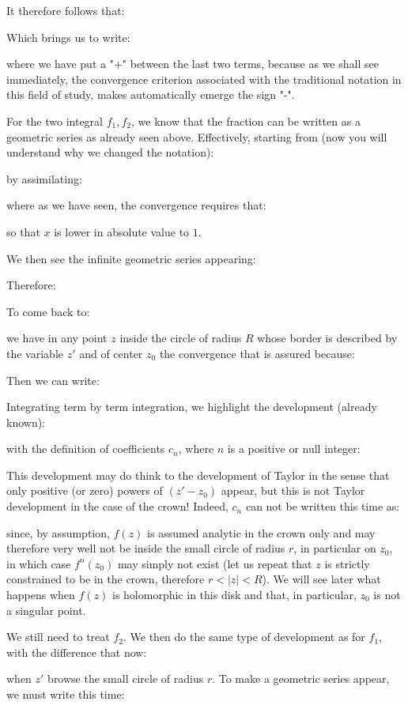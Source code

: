 	It therefore follows that:
	
	Which brings us to write:
	
	where we have put a "+" between the last two terms, because as we shall see immediately, the convergence criterion associated with the traditional notation in this field of study, makes automatically emerge the sign "-".
	
	For the two integral $f_1,f_2$, we know that the fraction can be written as a geometric series as already seen above. Effectively, starting from (now you will understand why we changed the notation):
	
	by assimilating:
	
	where as we have seen, the convergence requires that:
	
	so that $x$ is lower in absolute value to $1$.
	
	We then see the infinite geometric series appearing:
	
	Therefore:
	
	To come back to:
	
	we have in any point $z$ inside the circle of radius $R$ whose border is described by the variable $z'$ and of center $z_0$ the convergence that is assured because:
	
	Then we can write:
	
	Integrating term by term integration, we highlight the development (already known):
	
	with the definition of coefficients $c_n$, where $n$ is a positive or null integer:
	
	This development may do think to the development of Taylor in the sense that only positive (or zero) powers of $(z'-z_0)$ appear, but this is not Taylor development in the case of the crown! Indeed, $c_n$ can not be written this time as:
	
	since, by assumption, $f(z)$ is assumed analytic in the crown only and may therefore very well not be inside the small circle of radius $r$, in particular on $z_0$, in which case $f^{n}(z_0)$ may simply not exist (let us repeat that $z$ is strictly constrained to be in the crown, therefore $r<\vert z \vert <R$). We will see later what happens when $f (z)$ is holomorphic in this disk and that, in particular, $z_0$ is not a singular point.
	
	We still need to treat $f_2$. We then do the same type of development as for $f_1$, with the difference that now:
	
	when $z'$ browse the small circle of radius $r$. To make a geometric series appear, we must write this time:
	
